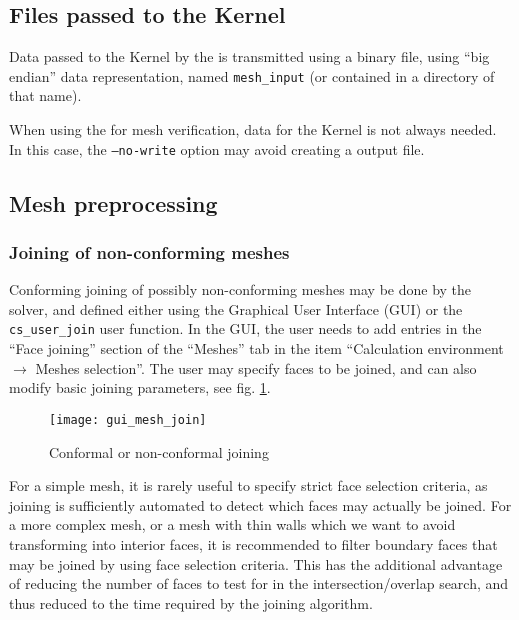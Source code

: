 {{{\subsection{Files passed to the Kernel\label{sec:pcs:mode_comm}}

Data passed to the Kernel by the \pcs is transmitted using a
binary file, using ``big endian'' data representation, named
\texttt{mesh\_input} (or contained in a directory of that name).

When using the \pcs for mesh verification, data for the Kernel
is not always needed. In this case, the \texttt{--no-write} option may
avoid creating a \pcs output file.

\subsection{Mesh preprocessing%
\label{sec:prepro}}

\subsubsection{Joining of non-conforming meshes}\label{sec:optpcs:join}

Conforming joining of possibly non-conforming meshes may be done by the
solver, and defined either using the Graphical User Interface (GUI) or the
\texttt{cs\_user\_join} user function. In the GUI, the user needs to
add entries in the ``Face joining'' section of the ``Meshes'' tab in the item
``Calculation environment $\rightarrow$ Meshes selection''.
The user may specify faces to be joined, and can also modify basic joining
parameters, see fig. \ref{fig:joining}.
%
\begin{figure}[!h]
\begin{center}
\texttt{[image: gui\_mesh\_join]}
\caption{Conformal or non-conformal joining}
\label{fig:joining}
\end{center}
\end{figure}
%
For a simple mesh, it is rarely useful to specify strict face selection
criteria, as joining is sufficiently automated to detect which faces
may actually be joined. For a more complex mesh, or a mesh with thin
walls which we want to avoid transforming into interior faces, it is
recommended to filter boundary faces that may be joined by using
face selection criteria. This has the
additional advantage of reducing the number of faces to test for
in the intersection/overlap search, and thus reduced to the time
required by the joining algorithm.

}}}
